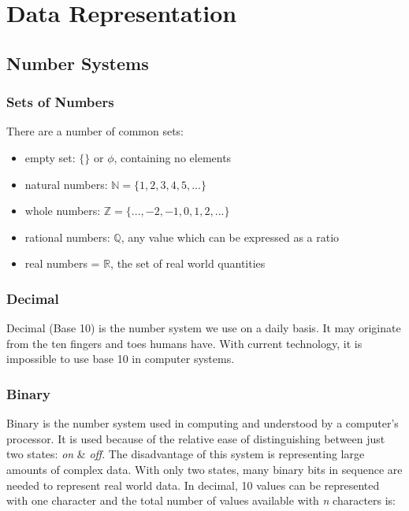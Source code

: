 \documentclass[10pt]{article}
\let\oldsection\section
\renewcommand\section{\clearpage\oldsection}
\begin{document}
\section{Data Representation}
\label{sec:org464d40c}
\subsection{Number Systems}
\label{sec:org8b409ab}
\subsubsection{Sets of Numbers}
\label{sec:orgbf85c8e}

There are a number of common sets:

\begin{itemize}
\item empty set: \(\{\}\) or \(\phi\), containing no elements
\item natural numbers: \(\mathbb{N} = \{1,2,3,4,5,...\}\)
\item whole numbers: \(\mathbb{Z} = \{...,-2,-1,0,1,2,...\}\)
\item rational numbers: \(\mathbb{Q}\), any value which can be expressed as a ratio
\item real numbers = \(\mathbb{R}\), the set of real world quantities
\end{itemize}

\subsubsection{Decimal}
\label{sec:org373dbd2}

Decimal (Base 10) is the number system we use on a daily basis. It may originate from the ten fingers and toes humans have. With current technology, it is impossible to use base 10 in computer systems.

\subsubsection{Binary}
\label{sec:org46a26da}

Binary is the number system used in computing and understood by a computer's processor. It is used because of the relative ease of distinguishing between just two states: \emph{on} \& \emph{off}. The disadvantage of this system is representing large amounts of complex data. With only two states, many binary bits in sequence are needed to represent real world data. In decimal, 10 values can be represented with one character and the total number of values available with \emph{n} characters is:
\end{document}
